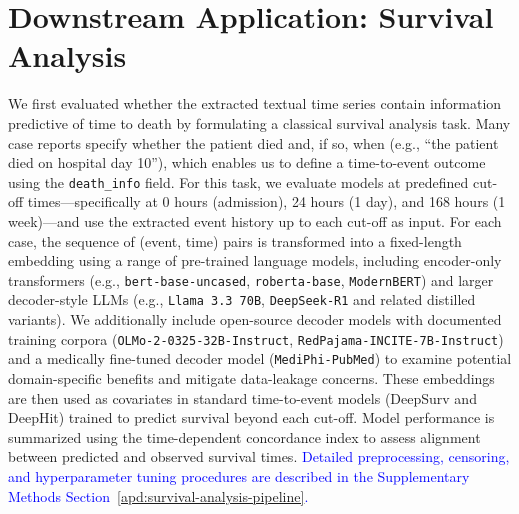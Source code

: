 \documentclass[pdflatex,sn-mathphys-num]{sn-jnl}%
\theoremstyle{thmstyleone}%
\theoremstyle{thmstyletwo}%
\theoremstyle{thmstylethree}%
\begin{document}



\section{Downstream Application: Survival Analysis}
\label{sec:downstream-application}

We first evaluated whether the extracted textual time series contain information predictive of time to death by formulating a classical survival analysis task. Many case reports specify whether the patient died and, if so, when (e.g., ``the patient died on hospital day 10''), which enables us to define a time-to-event outcome using the \texttt{death\_info} field. For this task, we evaluate models at predefined cut-off times—specifically at 0 hours (admission), 24 hours (1 day), and 168 hours (1 week)—and use the extracted event history up to each cut-off as input. For each case, the sequence of (event, time) pairs is transformed into a fixed-length embedding using a range of pre-trained language models, including encoder-only transformers (e.g., \texttt{bert-base-uncased}, \texttt{roberta-base}, \texttt{ModernBERT}) and larger decoder-style LLMs (e.g., \texttt{Llama 3.3 70B}, \texttt{DeepSeek-R1} and related distilled variants). We additionally include open-source decoder models with documented training corpora (\texttt{OLMo-2-0325-32B-Instruct}, \texttt{RedPajama-INCITE-7B-Instruct}) and a medically fine-tuned decoder model (\texttt{MediPhi-PubMed}) to examine potential domain-specific benefits and mitigate data-leakage concerns. These embeddings are then used as covariates in standard time-to-event models (DeepSurv and DeepHit) trained to predict survival beyond each cut-off. Model performance is summarized using the time-dependent concordance index to assess alignment between predicted and observed survival times. \textcolor{blue}{Detailed preprocessing, censoring, and hyperparameter tuning procedures are described in the Supplementary Methods Section~\ref{apd:survival-analysis-pipeline}.}

%
\end{document}
